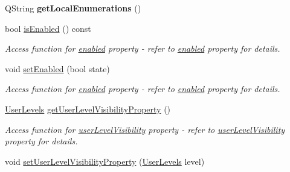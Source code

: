 \begin{DoxyCompactItemize}
\item 
\hypertarget{classQEComboBox_aa0360dd8e46137838e700772b83f52dd}{
QString {\bfseries getLocalEnumerations} ()}
\label{classQEComboBox_aa0360dd8e46137838e700772b83f52dd}

\item 
\hypertarget{classQEComboBox_af8030e0a18b42803331e58205ddae1ac}{
bool \hyperlink{classQEComboBox_af8030e0a18b42803331e58205ddae1ac}{isEnabled} () const }
\label{classQEComboBox_af8030e0a18b42803331e58205ddae1ac}

\begin{DoxyCompactList}\small\item\em Access function for \hyperlink{classQEComboBox_a0e38f748ae89b5b0a9d28ceb60f892a3}{enabled} property -\/ refer to \hyperlink{classQEComboBox_a0e38f748ae89b5b0a9d28ceb60f892a3}{enabled} property for details. \end{DoxyCompactList}\item 
\hypertarget{classQEComboBox_aded5ebb4564f46a728d4b6c1c59412c6}{
void \hyperlink{classQEComboBox_aded5ebb4564f46a728d4b6c1c59412c6}{setEnabled} (bool state)}
\label{classQEComboBox_aded5ebb4564f46a728d4b6c1c59412c6}

\begin{DoxyCompactList}\small\item\em Access function for \hyperlink{classQEComboBox_a0e38f748ae89b5b0a9d28ceb60f892a3}{enabled} property -\/ refer to \hyperlink{classQEComboBox_a0e38f748ae89b5b0a9d28ceb60f892a3}{enabled} property for details. \end{DoxyCompactList}\item 
\hypertarget{classQEComboBox_a0a2620e92bf010ceae9f01c172ba2a4c}{
\hyperlink{classQEComboBox_a7da014f2f323780d302cdf17ff2a5fa8}{UserLevels} \hyperlink{classQEComboBox_a0a2620e92bf010ceae9f01c172ba2a4c}{getUserLevelVisibilityProperty} ()}
\label{classQEComboBox_a0a2620e92bf010ceae9f01c172ba2a4c}

\begin{DoxyCompactList}\small\item\em Access function for \hyperlink{classQEComboBox_a4f08d8c6154291f534153a6c195be8de}{userLevelVisibility} property -\/ refer to \hyperlink{classQEComboBox_a4f08d8c6154291f534153a6c195be8de}{userLevelVisibility} property for details. \end{DoxyCompactList}\item 
\hypertarget{classQEComboBox_a0ba196fda6de104d3dc9e24387e7fc42}{
void \hyperlink{classQEComboBox_a0ba196fda6de104d3dc9e24387e7fc42}{setUserLevelVisibilityProperty} (\hyperlink{classQEComboBox_a7da014f2f323780d302cdf17ff2a5fa8}{UserLevels} level)}
\label{classQEComboBox_a0ba196fda6de104d3dc9e24387e7fc42}


\end{DoxyCompactItemize}
